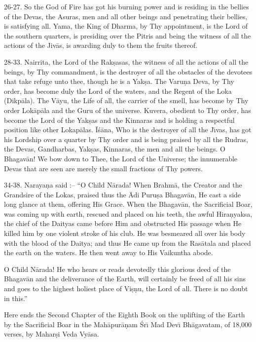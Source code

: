 26-27. So the God of Fire has got his burning power and is residing in the bellies of the Devas, the Asuras, men and all other beings and penetrating their bellies, is satisfying all. Yama, the King of Dharma, by Thy appointment, is the Lord of the southern quarters, is presiding over the Pitris and being the witness of all the actions of the Jiv\=as, is awarding duly to them the fruits thereof.

28-33. Nairrita, the Lord of the Rak\d{s}asas, the witness of all the actions of all the beings, by Thy commandment, is the destroyer of all the obstacles of the devotees that take refuge unto thee, though he is a Yak\d{s}a. The Varu\d{n}a Deva, by Thy order, has become duly the Lord of the waters, and the Regent of the Loka (Dikp\=ala). The V\=ayu, the Life of all, the carrier of the smell, has become by Thy order Lok\=ap\=ala and the Guru of the universe. Kuvera, obedient to Thy order, has become the Lord of the Yak\d{s}as and the Kinnaras and is holding a respectful position like other Lokap\=alas. \=I\'s\=ana, Who is the destroyer of all the J\={\i}vas, has got his Lordship over a quarter by Thy order and is being praised by all the Rudras, the Devas, Gandharbas, Yak\d{s}as, Kinnaras, the men and all the beings. O Bhagav\=an! We bow down to Thee, the Lord of the Universe; the innumerable Devas that are seen are merely the small fractions of Thy powers.

34-38. Naraya\d{n}a said :-- ``O Child N\=arada! When Brahm\=a, the Creator and the Grandsire of the Lokas, praised thus the \=Adi Puru\d{s}a Bhagav\=an, He cast a side long glance at them, offering His Grace. When the Bhagav\=an, the Sacrificial Boar, was coming up with earth, rescued and placed on his teeth, the awful Hira\d{n}yaksa, the chief of the Daityas came before Him and obstructed His passage when He killed him by one violent stroke of his club. He was besmeared all over his body with the blood of the Daitya; and thus He came up from the Ras\=atala and placed the earth on the waters. He then went away to His Vaikuntha abode.

O Child N\=arada! He who hears or reads devotedly this glorious deed of the Bhagav\=an and the deliverance of the Earth, will certainly be freed of all his sins and goes to the highest holiest place of Vi\d{s}\d{n}u, the Lord of all. There is no doubt in this.''

Here ends the Second Chapter of the Eighth Book on the uplifting of the Earth by the Sacrificial Boar in the Mah\=apur\=a\d{n}am \'Sr\={\i} Mad Dev\={\i} Bh\=agavatam, of 18,000 verses, by Mahar\d{s}i Veda Vy\=asa.



